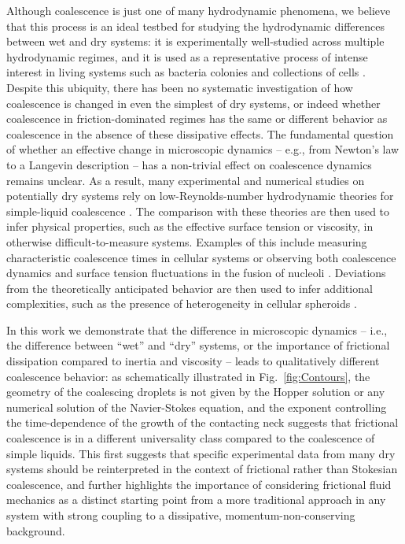 \documentclass[%
reprint,
amsmath,amssymb,
aps,
]{revtex4-2}
\begin{document}
	Although coalescence is just one of many hydrodynamic phenomena, we believe that this process is an ideal testbed for studying the hydrodynamic differences between wet and dry systems: it is experimentally well-studied across multiple hydrodynamic regimes, and it is used as a representative process of intense interest in living systems such as bacteria colonies \cite{ponisch2018pili,welker2018molecular} and collections of cells \cite{grosserCellNucleusShape2021a, koshelevaCellSpheroidFusion2020a, oriola2022arrested}. Despite this ubiquity, there has been no systematic investigation of how coalescence is changed in even the simplest of dry systems, or indeed whether coalescence in friction-dominated regimes has the same or different behavior as coalescence in the absence of these dissipative effects. The fundamental question of whether an effective change in microscopic dynamics -- e.g., from Newton's law to a Langevin description -- has a non-trivial effect on coalescence dynamics remains unclear. As a result, many experimental and numerical studies on potentially dry systems rely on low-Reynolds-number hydrodynamic theories for simple-liquid coalescence \cite{flennerKineticMonteCarlo2012,brangwynne2011active, caragineSurfaceFluctuationsCoalescence2018a,grosserCellNucleusShape2021a,koshelevaCellSpheroidFusion2020a}. The comparison with these theories are then used to infer physical properties, such as the effective surface tension or viscosity, in otherwise difficult-to-measure systems. Examples of this include measuring characteristic coalescence times in cellular systems \cite{koshelevaCellSpheroidFusion2020a,grosserCellNucleusShape2021a} or observing both coalescence dynamics and surface tension fluctuations in the fusion of nucleoli \cite{caragineSurfaceFluctuationsCoalescence2018a}. Deviations from the theoretically anticipated behavior are then used to infer additional complexities, such as the presence of heterogeneity in cellular spheroids \cite{grosserCellNucleusShape2021a,koshelevaCellSpheroidFusion2020a}. 
	
	
	In this work we demonstrate that the difference in microscopic dynamics -- i.e., the difference between ``wet'' and ``dry'' systems, or the importance of frictional dissipation compared to inertia and viscosity -- leads to qualitatively different coalescence behavior:  as schematically illustrated in Fig.~\ref{fig:Contours}, the geometry of the coalescing droplets is not given by the Hopper solution or any numerical solution of the Navier-Stokes equation, and the exponent controlling the time-dependence of the growth of the contacting neck suggests that frictional coalescence is in a different universality class compared to the coalescence of simple liquids. This first suggests that specific experimental data from many dry systems should be reinterpreted in the context of frictional rather than Stokesian coalescence, and further highlights the importance of considering frictional fluid mechanics as a distinct starting point from a more traditional approach in any system with strong coupling to a dissipative, momentum-non-conserving background.
	
\end{document}

